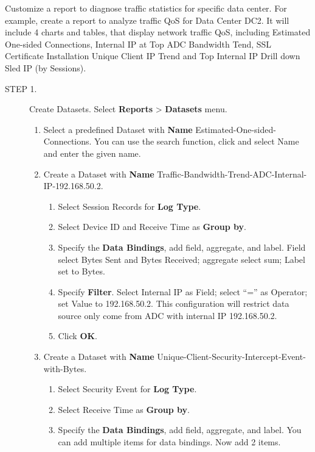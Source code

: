 Customize a report to diagnose traffic statistics for specific data center. For example, create a report to analyze traffic QoS for Data Center DC2. It will include 4 charts and tables, that display network traffic QoS, including Estimated One-sided Connections, Internal IP at Top ADC Bandwidth Tend, SSL Certificate Installation Unique Client IP Trend and Top Internal IP Drill down Sled IP (by Sessions).


\begin{description}
    \item[STEP 1.]	Create Datasets. Select \textbf{Reports} > \textbf{Datasets} menu.
    \begin{enumerate}
        \item 	Select a predefined Dataset with \textbf{Name} Estimated-One-sided-Connections. You can use the search function, click and select Name and enter the given name.
        \item 	Create a Dataset with \textbf{Name} Traffic-Bandwidth-Trend-ADC-Internal-IP-192.168.50.2.
        \begin{enumerate}
            \item	Select Session Records for \textbf{Log Type}.
            \item	Select Device ID and Receive Time as \textbf{Group by}. 
            \item	Specify the \textbf{Data Bindings}, add field, aggregate, and label. Field select Bytes Sent and Bytes Received; aggregate select sum; Label set to Bytes. 
            \item	Specify \textbf{Filter}. Select Internal IP as Field; select “=” as Operator; set Value to 192.168.50.2. This configuration will restrict data source only come from ADC with internal IP 192.168.50.2.
            \item	Click \textbf{OK}.
        \end{enumerate}
        \item 	Create a Dataset with \textbf{Name} Unique-Client-Security-Intercept-Event-with-Bytes.
        \begin{enumerate}
            \item	Select Security Event for \textbf{Log Type}.
            \item	Select Receive Time as \textbf{Group by}. 
            \item	Specify the \textbf{Data Bindings}, add field, aggregate, and label. You can add multiple items for data bindings. Now add 2 items. 
            \begin{enumerate}

\end{enumerate}
\end{enumerate}
\end{enumerate}
\end{description}
